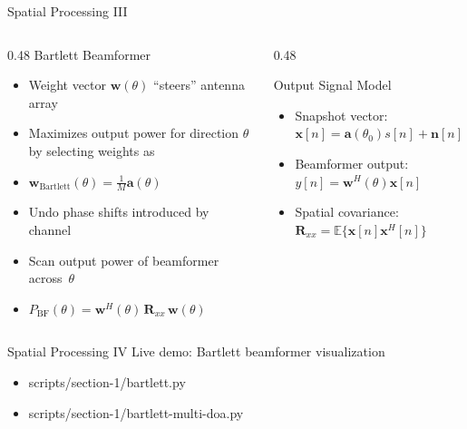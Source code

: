 \begin{frame}{Spatial Processing III}
  \begin{columns}[onlytextwidth]
    \begin{column}{0.48\textwidth}
      Bartlett Beamformer
      \begin{itemize}
        \item Weight vector $\mathbf{w}(\theta)$ ``steers'' antenna array
        \item Maximizes output power for direction $\theta$ by selecting weights as
        \item $\mathbf{w}_\text{Bartlett}(\theta) = \frac{1}{M}\mathbf{a}(\theta)$
        \item Undo phase shifts introduced by channel
        \item Scan output power of beamformer across~$\theta$
        \item $P_{\mathrm{BF}}(\theta) = \mathbf{w}^H(\theta)\,\mathbf{R}_{xx}\,\mathbf{w}(\theta)$
      \end{itemize}
    \end{column}

    \begin{column}{0.48\textwidth}
      
      \begin{block}{Output Signal Model}
        \begin{itemize}
          \item Snapshot vector: $\mathbf{x}[n] = \mathbf{a}(\theta_0)s[n] + \mathbf{n}[n]$
          \item Beamformer output: $y[n] = \mathbf{w}^H(\theta)\mathbf{x}[n]$
          \item Spatial covariance: $\mathbf{R}_{xx} = \mathbb{E}\{\mathbf{x}[n]\mathbf{x}^H[n]\}$
        \end{itemize}
      \end{block}
    \end{column}
  \end{columns}
\end{frame}

\begin{frame}{Spatial Processing IV}
  \centering
  Live demo: Bartlett beamformer visualization
  \begin{itemize}
    \item scripts/section-1/bartlett.py
    \item scripts/section-1/bartlett-multi-doa.py
  \end{itemize}
\end{frame}


